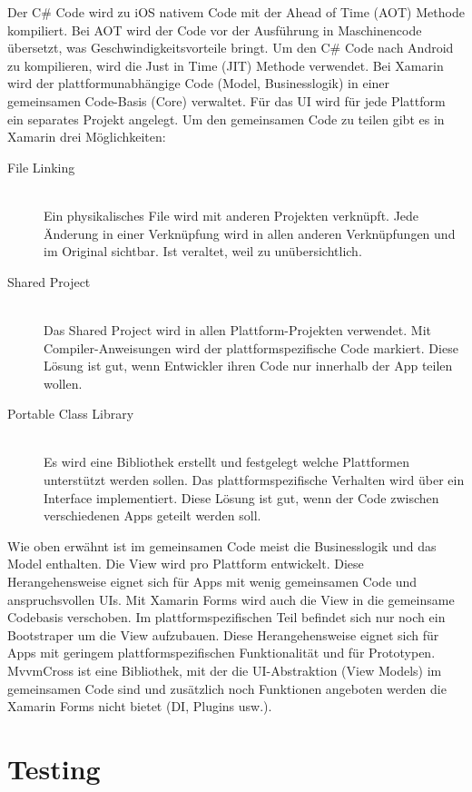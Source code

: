 Der C\# Code wird zu iOS nativem Code mit der Ahead of Time (AOT) Methode kompiliert. Bei AOT wird der Code vor der Ausführung in Maschinencode übersetzt, was Geschwindigkeitsvorteile bringt. Um den C\# Code nach Android zu kompilieren, wird die Just in Time (JIT) Methode verwendet. Bei Xamarin wird der plattformunabhängige Code (Model, Businesslogik) in einer gemeinsamen Code-Basis (Core) verwaltet. Für das UI wird für jede Plattform ein separates Projekt angelegt. Um den gemeinsamen Code zu teilen gibt es in Xamarin drei Möglichkeiten:
\begin{description}
	\item[File Linking] \hfill \\
	Ein physikalisches File wird mit anderen Projekten verknüpft. Jede Änderung in einer Verknüpfung wird in allen anderen Verknüpfungen und im Original sichtbar. Ist veraltet, weil zu unübersichtlich.
	\item[Shared Project] \hfill \\
	Das Shared Project wird in allen Plattform-Projekten verwendet. Mit Compiler-Anweisungen wird der plattformspezifische Code markiert. Diese Lösung ist gut, wenn Entwickler ihren Code nur innerhalb der App teilen wollen.
	\item[Portable Class Library] \hfill \\
	Es wird eine Bibliothek erstellt und festgelegt welche Plattformen unterstützt werden sollen. Das plattformspezifische Verhalten wird über ein Interface implementiert. Diese Lösung ist gut, wenn der Code zwischen verschiedenen Apps geteilt werden soll.
\end{description}
Wie oben erwähnt ist im gemeinsamen Code meist die Businesslogik und das Model enthalten. Die View wird pro Plattform entwickelt. Diese Herangehensweise eignet sich für Apps mit wenig gemeinsamen Code und anspruchsvollen UIs. Mit Xamarin Forms wird auch die View in die gemeinsame Codebasis verschoben. Im plattformspezifischen Teil befindet sich nur noch ein Bootstraper um die View aufzubauen. Diese Herangehensweise eignet sich für Apps mit geringem plattformspezifischen Funktionalität und für Prototypen.
MvvmCross ist eine Bibliothek, mit der die UI-Abstraktion (View Models) im gemeinsamen Code sind und zusätzlich noch Funktionen angeboten werden die Xamarin Forms nicht bietet (DI, Plugins usw.).

\section{Testing}

